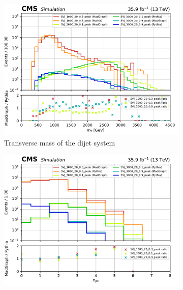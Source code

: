 \begin{figure}[htbp]
    \centering
    \begin{subfigure}[b]{0.48\textwidth}
        \includegraphics[width=\textwidth]{figures/madgraph_pythia_comparisons/with_ratios/part1/dijet_mt.pdf}
        \caption{Transverse mass of the dijet system}
    \end{subfigure}
    \hfill
    \begin{subfigure}[b]{0.48\textwidth}
        \includegraphics[width=\textwidth]{figures/madgraph_pythia_comparisons/with_ratios/part1/njet.pdf}
        \caption{\njet}
    \end{subfigure}


\end{figure}
